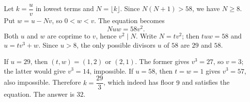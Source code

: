 Let $k=\dfrac{u}{v}$ in lowest terms and $N=\lfloor k\rfloor$. Since $N(N+1)>58$, we have $N\ge8$. Put $w=u-Nv$, so $0<w<v$. The equation becomes
\[
Nu w=58v^2.
\]
Both $u$ and $w$ are coprime to $v$, hence $v^2\mid N$. Write $N=t v^2$; then $tuw=58$ and $u=tv^3+w$. Since $u>8$, the only possible divisors $u$ of $58$ are $29$ and $58$.

If $u=29$, then $(t,w)=(1,2)$ or $(2,1)$. The former gives $v^3=27$, so $v=3$; the latter would give $v^3=14$, impossible. If $u=58$, then $t=w=1$ gives $v^3=57$, also impossible. Therefore $k=\dfrac{29}{3}$, which indeed has floor $9$ and satisfies the equation. The answer is $\boxed{32}$.
